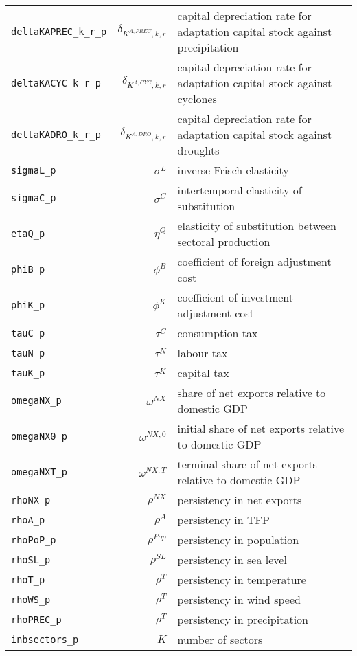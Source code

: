 \begin{center}
\begin{longtable}{lrl}
\texttt{deltaKAPREC\_k\_r\_p} & ${\delta_{K^{A,PREC},k,r}}$ & capital depreciation rate for adaptation capital stock against precipitation\\
\texttt{deltaKACYC\_k\_r\_p} & ${\delta_{K^{A,CYC},k,r}}$ & capital depreciation rate for adaptation capital stock against cyclones\\
\texttt{deltaKADRO\_k\_r\_p} & ${\delta_{K^{A,DRO},k,r}}$ & capital depreciation rate for adaptation capital stock against droughts\\
\texttt{sigmaL\_p} & ${\sigma^{L}}$ & inverse Frisch elasticity\\
\texttt{sigmaC\_p} & ${\sigma^{C}}$ & intertemporal elasticity of substitution\\
\texttt{etaQ\_p} & ${\eta^{Q}}$ & elasticity of substitution between sectoral production\\
\texttt{phiB\_p} & ${\phi^{B}}$ & coefficient of foreign adjustment cost\\
\texttt{phiK\_p} & ${\phi^{K}}$ & coefficient of investment adjustment cost\\
\texttt{tauC\_p} & ${\tau^{C}}$ & consumption tax\\
\texttt{tauN\_p} & ${\tau^{N}}$ & labour tax\\
\texttt{tauK\_p} & ${\tau^{K}}$ & capital tax\\
\texttt{omegaNX\_p} & ${\omega^{NX}}$ & share of net exports relative to domestic GDP\\
\texttt{omegaNX0\_p} & ${\omega^{NX,0}}$ & initial share of net exports relative to domestic GDP\\
\texttt{omegaNXT\_p} & ${\omega^{NX,T}}$ & terminal share of net exports relative to domestic GDP\\
\texttt{rhoNX\_p} & ${\rho^{NX}}$ & persistency in net exports\\
\texttt{rhoA\_p} & ${\rho^{A}}$ & persistency in TFP\\
\texttt{rhoPoP\_p} & ${\rho^{Pop}}$ & persistency in population\\
\texttt{rhoSL\_p} & ${\rho^{SL}}$ & persistency in sea level\\
\texttt{rhoT\_p} & ${\rho^{T}}$ & persistency in temperature\\
\texttt{rhoWS\_p} & ${\rho^{T}}$ & persistency in wind speed\\
\texttt{rhoPREC\_p} & ${\rho^{T}}$ & persistency in precipitation\\
\texttt{inbsectors\_p} & ${K}$ & number of sectors\\

\end{longtable}
\end{center}

